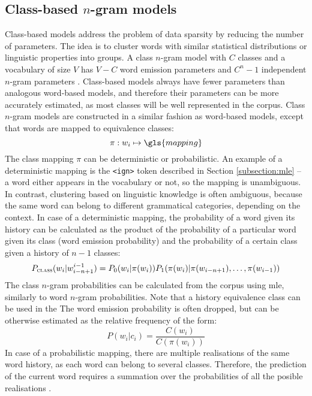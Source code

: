 	\subsection{Class-based $n$-gram models}
	Class-based models address the problem of data sparsity by reducing the number of parameters. The idea is to cluster words with similar statistical distributions or linguistic properties into groups. A class $n$-gram model with $C$ classes and a vocabulary of size $V$ has $V-C$ word emission parameters and $C^{n}-1$ independent $n$-gram parameters \cite{brown1992class}. Class-based models always have fewer parameters than analogous word-based models, and therefore their parameters can be more accurately estimated, as most classes will be well represented in the corpus. Class $n$-gram models are constructed in a similar fashion as word-based models, except that words are mapped to equivalence classes: 
	\begin{equation}
		\pi:w_{i}\mapsto \gls{mapping}
		\label{equation:deterministic_class}
	\end{equation}
	The class mapping $\pi$ can be deterministic or probabilistic. An example of a deterministic mapping is the \texttt{<ign>} token described in Section \ref{subsection:mle} -- a word either appears in the vocabulary or not, so the mapping is unambiguous. In contrast, clustering based on linguistic knowledge is often ambiguous, because the same word can belong to different grammatical categories, depending on the context. 
	In case of a deterministic mapping, the probability of a word given its history can be calculated as the product of the probability of a particular word given its class (word emission probability) and the probability of a certain class given a history of $n-1$ classes:
	\begin{equation}
		P_{\textsc{class}}(w_{i}|w_{i-n+1}^{i-1})=P_{0}(w_{i}|\pi(w_{i}))P_{1}(\pi(w_{i})|\pi(w_{i-n+1}), \dots, \pi(w_{i-1}))
		\label{equation:classngram}
	\end{equation}
	The class $n$-gram probabilities can be calculated from the corpus using \gls{mle}, similarly to word $n$-gram probabilities. Note that a history equivalence class can be used in the The word emission probability is often dropped, but can be otherwise estimated as the relative frequency of the form:
	\begin{equation}
		P(w_{i}|c_{i})=\frac{C(w_{i})}{C(\pi(w_{i}))}
		\label{equation:emission_probability}
	\end{equation}
	In case of a probabilistic mapping, there are multiple realisations of the same word history, as each word can belong to several classes. Therefore, the prediction of the current word requires a summation over the probabilities of all the posible realisations \cite{ney1994structuring}.
